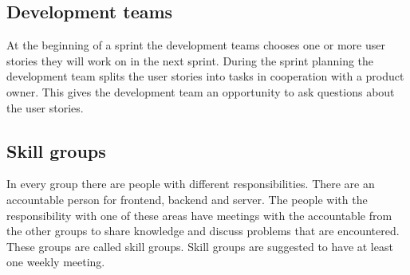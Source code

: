 \subsection{Development teams}
At the beginning of a sprint the development teams chooses one or more user stories they will work on in the next sprint.
During the sprint planning the development team splits the user stories into tasks in cooperation with a product owner.
This gives the development team an opportunity to ask questions about the user stories.

\subsection{Skill groups}
In every group there are people with different responsibilities.
There are an accountable person for frontend, backend and server.
The people with the responsibility with one of these areas have meetings with the accountable from the other groups to share knowledge and discuss problems that are encountered.
These groups are called skill groups.
Skill groups are suggested to have at least one weekly meeting.
